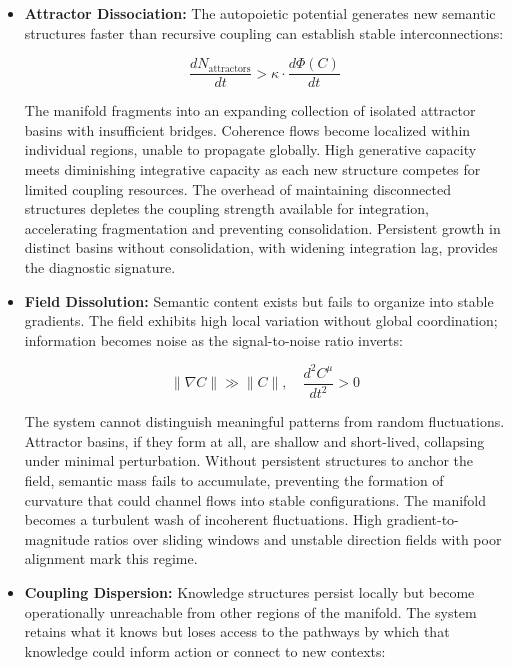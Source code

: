 \begin{itemize}
    
    \item \textbf{Attractor Dissociation:} The autopoietic potential generates new semantic structures faster than recursive coupling can establish stable interconnections:

    \begin{equation}
    \frac{dN_{\text{attractors}}}{dt} > \kappa \cdot \frac{d\Phi(C)}{dt}
    \end{equation}

    The manifold fragments into an expanding collection of isolated attractor basins with insufficient bridges. Coherence flows become localized within individual regions, unable to propagate globally. High generative capacity meets diminishing integrative capacity as each new structure competes for limited coupling resources. The overhead of maintaining disconnected structures depletes the coupling strength available for integration, accelerating fragmentation and preventing consolidation. Persistent growth in distinct basins without consolidation, with widening integration lag, provides the diagnostic signature.

    \item \textbf{Field Dissolution:} Semantic content exists but fails to organize into stable gradients. The field exhibits high local variation without global coordination; information becomes noise as the signal-to-noise ratio inverts:

    \begin{equation}
    \|\nabla C\| \gg \|C\|, \quad \frac{d^2C^\mu}{dt^2} > 0
    \end{equation}

    The system cannot distinguish meaningful patterns from random fluctuations. Attractor basins, if they form at all, are shallow and short-lived, collapsing under minimal perturbation. Without persistent structures to anchor the field, semantic mass fails to accumulate, preventing the formation of curvature that could channel flows into stable configurations. The manifold becomes a turbulent wash of incoherent fluctuations. High gradient-to-magnitude ratios over sliding windows and unstable direction fields with poor alignment mark this regime.
    
    \item \textbf{Coupling Dispersion:} Knowledge structures persist locally but become operationally unreachable from other regions of the manifold. The system retains what it knows but loses access to the pathways by which that knowledge could inform action or connect to new contexts:


\end{itemize}
